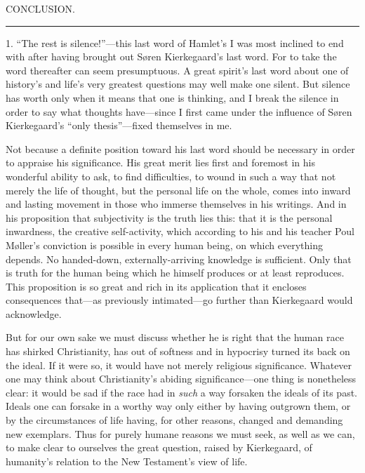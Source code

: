 \documentclass[12pt,a4paper]{book}
\newcommand{\opage}[1]{\marginnote{\footnotesize\textit{[#1]}}}
\begin{document}
\opage{150}\begin{center}CONCLUSION.\\[4pt]\rule{1.5cm}{0.4pt}\end{center}

1. ``The rest is silence!''---this last word of Hamlet's I was most
inclined to end with after having brought out Søren Kierkegaard's last
word. For to take the word thereafter can seem presumptuous. A great
spirit's last word about one of history's and life's very greatest
questions may well make one silent. But silence has worth only when it
means that one is thinking, and I break the silence in order to say what
thoughts have---since I first came under the influence of Søren
Kierkegaard's ``only thesis''---fixed themselves in me.

Not because a definite position toward his last word should be necessary
in order to appraise his significance. His great merit lies first and
foremost in his wonderful ability to ask, to find difficulties, to wound
in such a way that not merely the life of thought, but the personal life
on the whole, comes into inward and lasting movement in those who immerse
themselves in his writings. And in his proposition that subjectivity is
the truth lies this: that it is the personal inwardness, the creative
self-activity, which according to his and his teacher Poul Møller's
conviction is possible in every human being, on which everything depends.
No handed-down, externally-arriving knowledge is sufficient. Only that is
\opage{151}truth for the human being which he himself produces or at least
reproduces. This proposition is so great and rich in its application that
it encloses consequences that---as previously intimated---go further than
Kierkegaard would acknowledge.

But for our own sake we must discuss whether he is right that the human
race has shirked Christianity, has out of softness and in hypocrisy
turned its back on the ideal. If it were so, it would have not merely
religious significance. Whatever one may think about Christianity's
abiding significance---one thing is nonetheless clear: it would be sad if
the race had in \textit{such} a way forsaken the ideals of its past.
Ideals one can forsake in a worthy way only either by having outgrown
them, or by the circumstances of life having, for other reasons, changed
and demanding new exemplars. Thus for purely humane reasons we must seek,
as well as we can, to make clear to ourselves the great question, raised
by Kierkegaard, of humanity's relation to the New Testament's view of
life.
\end{document}
